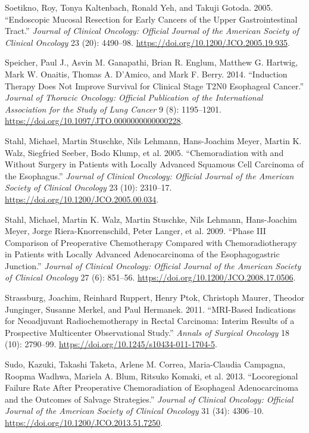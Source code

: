 \documentclass[
  letterpaper,
]{scrbook}
\newlength{\cslhangindent}
\newenvironment{CSLReferences}[2] %
 {\begin{list}{}{%
  \setlength{\itemindent}{0pt}
  \setlength{\leftmargin}{0pt}
  \setlength{\parsep}{0pt}
  \ifodd #1
   \setlength{\leftmargin}{\cslhangindent}
   \setlength{\itemindent}{-1\cslhangindent}
  \fi
  \setlength{\itemsep}{#2\baselineskip}}}
 {\end{list}}
\begin{document}
\begin{CSLReferences}{1}{0}
Soetikno, Roy, Tonya Kaltenbach, Ronald Yeh, and Takuji Gotoda. 2005.
{``Endoscopic Mucosal Resection for Early Cancers of the Upper
Gastrointestinal Tract.''} \emph{Journal of Clinical Oncology: Official
Journal of the American Society of Clinical Oncology} 23 (20): 4490--98.
\url{https://doi.org/10.1200/JCO.2005.19.935}.

Speicher, Paul J., Asvin M. Ganapathi, Brian R. Englum, Matthew G.
Hartwig, Mark W. Onaitis, Thomas A. D'Amico, and Mark F. Berry. 2014.
{``Induction Therapy Does Not Improve Survival for Clinical Stage {T2N0}
Esophageal Cancer.''} \emph{Journal of Thoracic Oncology: Official
Publication of the International Association for the Study of Lung
Cancer} 9 (8): 1195--1201.
\url{https://doi.org/10.1097/JTO.0000000000000228}.

Stahl, Michael, Martin Stuschke, Nils Lehmann, Hans-Joachim Meyer,
Martin K. Walz, Siegfried Seeber, Bodo Klump, et al. 2005.
{``Chemoradiation with and Without Surgery in Patients with Locally
Advanced Squamous Cell Carcinoma of the Esophagus.''} \emph{Journal of
Clinical Oncology: Official Journal of the American Society of Clinical
Oncology} 23 (10): 2310--17.
\url{https://doi.org/10.1200/JCO.2005.00.034}.

Stahl, Michael, Martin K. Walz, Martin Stuschke, Nils Lehmann,
Hans-Joachim Meyer, Jorge Riera-Knorrenschild, Peter Langer, et al.
2009. {``Phase {III} Comparison of Preoperative Chemotherapy Compared
with Chemoradiotherapy in Patients with Locally Advanced Adenocarcinoma
of the Esophagogastric Junction.''} \emph{Journal of Clinical Oncology:
Official Journal of the American Society of Clinical Oncology} 27 (6):
851--56. \url{https://doi.org/10.1200/JCO.2008.17.0506}.

Strassburg, Joachim, Reinhard Ruppert, Henry Ptok, Christoph Maurer,
Theodor Junginger, Susanne Merkel, and Paul Hermanek. 2011.
{``{MRI}-Based Indications for Neoadjuvant Radiochemotherapy in Rectal
Carcinoma: Interim Results of a Prospective Multicenter Observational
Study.''} \emph{Annals of Surgical Oncology} 18 (10): 2790--99.
\url{https://doi.org/10.1245/s10434-011-1704-5}.

Sudo, Kazuki, Takashi Taketa, Arlene M. Correa, Maria-Claudia Campagna,
Roopma Wadhwa, Mariela A. Blum, Ritsuko Komaki, et al. 2013.
{``Locoregional Failure Rate After Preoperative Chemoradiation of
Esophageal Adenocarcinoma and the Outcomes of Salvage Strategies.''}
\emph{Journal of Clinical Oncology: Official Journal of the American
Society of Clinical Oncology} 31 (34): 4306--10.
\url{https://doi.org/10.1200/JCO.2013.51.7250}.


\end{CSLReferences}
\end{document}
